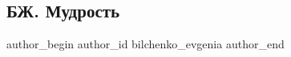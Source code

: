  
 
 
 
 
 
\subsection{БЖ. Мудрость}
\label{sec:27_12_2020.fb.bilchenko_evgenia.3.mudrost}
\ifcmt
 author_begin
   author_id bilchenko_evgenia
 author_end
\fi
